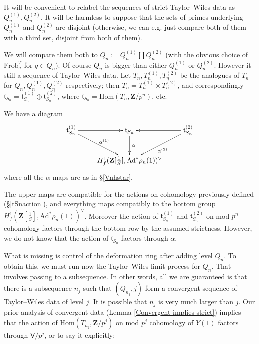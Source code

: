 \documentclass[10pt]{amsart}
\newcommand{\Z}{\mathbf{Z}}
\newcommand{\Ad}{\mathrm{Ad}}
\newcommand{\Hom}{\mathrm{Hom}}
\newcommand{\Frob}{\mathrm{Frob}}
\newcommand{\Vinf}{\mathsf{V}}
\theoremstyle{remark}
\begin{document}
 \proof 
 It will be convenient to relabel the sequences of strict Taylor--Wiles data as $Q_n^{(1)},  Q_n^{(2)}$.  It will be harmless to suppose that  the sets of primes underlying 
  $Q_n^{(1)}$ and $Q_n^{(2)}$ are disjoint (otherwise, we can  e.g. just compare both of them with a third set, disjoint from both of them). 
%
%
   
We will compare them both to $Q_n := Q_n^{(1)} \coprod Q_n^{(2)}$  (with the obvious choice of $\Frob_q^T$ for $q \in Q_n$). 
  Of course $Q_n$ is bigger than either $Q_n^{(1)}$ or $Q_n^{(2)}$. However it still a
  sequence of Taylor--Wiles data.   
  Let $T_n, T_n^{(1)}, T_n^{(2)}$ be the analogues of $T_n$ for $Q_n, Q_n^{(1)}, Q_n^{(2)}$ respectively;
  then $T_n = T_n^{(1)} \times T_n^{(2)}$,
  and correspondingly $\mathfrak{t}_{S_n} = \mathfrak{t}_{S_n}^{(1)} \oplus \mathfrak{t}_{S_n}^{(2)}$,
  where $\mathfrak{t}_{S_n} = \Hom(T_n, \Z/p^n)$, etc. 
  
  
  
 We have a diagram 
 \begin{equation} \label{tvlift} 
 \xymatrix{
\mathfrak{t}_{S_n}^{(1)} \ar[r] \ar[rd]^{\alpha^{(1)}}   &     \mathfrak{t}_{S_n}  \ar[d]^{\alpha}     &  \mathfrak{t}_{S_n}^{(2)} \ar[ld]^{\alpha^{(2)}} \ar[l].\\
  & H^1_f(\Z[\frac{1}{S}], \Ad^* \rho_n(1))^{\vee}  & 
 }
 \end{equation} 
 where all the $\alpha$-maps are as in   \S \ref{Vnhstar}.

 
 The upper maps are compatible for the actions on cohomology previously defined (\S \ref{tSnaction}),
 and everything maps compatibly to the bottom group $H^1_f(\Z[\frac{1}{S}], \Ad^* \rho_n(1))^{\vee} $. Moreover the  action of $\mathfrak{t}_{S_n}^{(1)}$ and $\mathfrak{t}_{S_n}^{(2)}$ on  
mod $p^n$ cohomology factors through the bottom row  by the assumed strictness. However, we do not know that the action of $\mathfrak{t}_{S_n}$ factors through $\alpha$.
%
%
%
 
%

What is missing is control of the deformation ring after adding level $Q_n$. To obtain this,  we must run now the Taylor--Wiles limit process for $Q_n$. That involves passing   to a subsequence. 
In other words, all we are guaranteed is that there is a subsequence $n_j$ such 
that $(Q_{n_j}, j)$ form a  convergent sequence  of Taylor--Wiles  data of level $j$. 
It is possible that $n_j$ is very much larger than $j$. Our prior analysis of convergent data (Lemma \ref{Convergent implies strict})  implies
that the action of $\Hom(T_{n_j}, \Z/p^j)$  on mod $p^j$ cohomology of $Y(1)$
factors through $\Vinf/p^j$, or to say it explicitly: 
\end{document}
